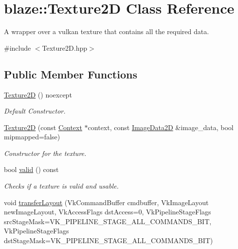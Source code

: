 \hypertarget{classblaze_1_1Texture2D}{}\section{blaze\+:\+:Texture2D Class Reference}
\label{classblaze_1_1Texture2D}


A wrapper over a vulkan texture that contains all the required data.  




{\ttfamily \#include $<$Texture2\+D.\+hpp$>$}

\subsection*{Public Member Functions}
\begin{DoxyCompactItemize}
\item 
\mbox{\label{classblaze_1_1Texture2D_ac2c630eccb2ac79ee331e03980622cc3}} 
\hyperlink{classblaze_1_1Texture2D_ac2c630eccb2ac79ee331e03980622cc3}{Texture2D} () noexcept
\begin{DoxyCompactList}\small\item\em Default Constructor. \end{DoxyCompactList}\item 
\hyperlink{classblaze_1_1Texture2D_ad3f7b6a52513786666cc64281a098d12}{Texture2D} (const \hyperlink{classblaze_1_1Context}{Context} $\ast$context, const \hyperlink{structblaze_1_1ImageData2D}{Image\+Data2D} \&image\+\_\+data, bool mipmapped=false)
\begin{DoxyCompactList}\small\item\em Constructor for the texture. \end{DoxyCompactList}\item 
bool \hyperlink{classblaze_1_1Texture2D_af8ce33dec5506e1f52df11f7aef8c9fc}{valid} () const
\begin{DoxyCompactList}\small\item\em Checks if a texture is valid and usable. \end{DoxyCompactList}\item 
void \hyperlink{classblaze_1_1Texture2D_a14cd835af0b1c5e137f10dbb7b968e83}{transfer\+Layout} (Vk\+Command\+Buffer cmdbuffer, Vk\+Image\+Layout new\+Image\+Layout, Vk\+Access\+Flags dst\+Access=0, Vk\+Pipeline\+Stage\+Flags src\+Stage\+Mask=V\+K\+\_\+\+P\+I\+P\+E\+L\+I\+N\+E\+\_\+\+S\+T\+A\+G\+E\+\_\+\+A\+L\+L\+\_\+\+C\+O\+M\+M\+A\+N\+D\+S\+\_\+\+B\+IT, Vk\+Pipeline\+Stage\+Flags dst\+Stage\+Mask=V\+K\+\_\+\+P\+I\+P\+E\+L\+I\+N\+E\+\_\+\+S\+T\+A\+G\+E\+\_\+\+A\+L\+L\+\_\+\+C\+O\+M\+M\+A\+N\+D\+S\+\_\+\+B\+IT)

\end{DoxyCompactItemize}
